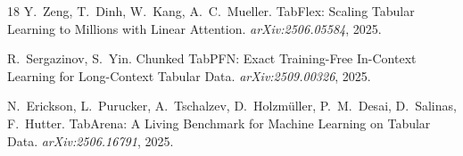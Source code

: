\documentclass{article}
\begin{document}
\begin{thebibliography}{18}
Y.~Zeng, T.~Dinh, W.~Kang, A.~C.~Mueller.
\newblock TabFlex: Scaling Tabular Learning to Millions with Linear
Attention.
\newblock \emph{arXiv:2506.05584}, 2025.

R.~Sergazinov, S.~Yin.
\newblock Chunked TabPFN: Exact Training-Free In-Context Learning for
Long-Context Tabular Data.
\newblock \emph{arXiv:2509.00326}, 2025.

N.~Erickson, L.~Purucker, A.~Tschalzev, D.~Holzm\"uller, P.~M.~Desai,
D.~Salinas, F.~Hutter.
\newblock TabArena: A Living Benchmark for Machine Learning on Tabular Data.
\newblock \emph{arXiv:2506.16791}, 2025.

\end{thebibliography}
\end{document}
